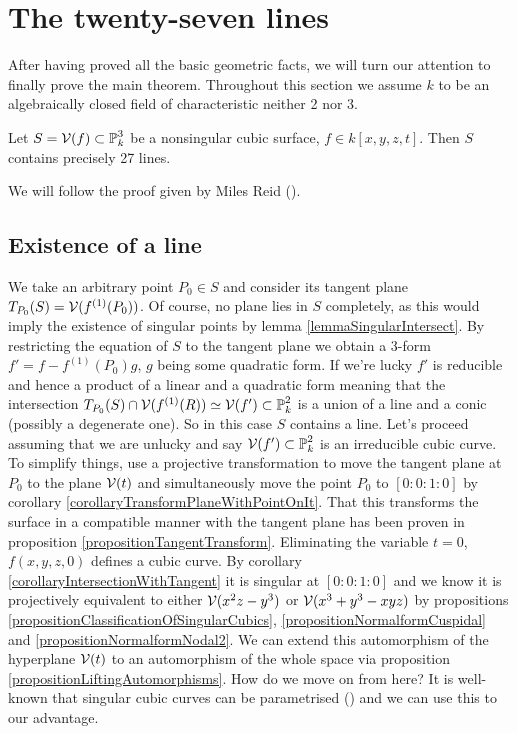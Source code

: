 \section{The twenty-seven lines}

After having proved all the basic geometric facts, we will turn our attention to finally prove the main theorem. Throughout this section we assume $k$ to be an algebraically closed field of characteristic neither 2 nor 3.
\begin{theorem}
Let $S = \operatorname{\mathcal V}(f) \subset \operatorname{\mathbb P}^3_k$ be a nonsingular cubic surface, $f\in k[x,y,z,t]$.
Then $S$ contains precisely 27 lines.
\end{theorem}
We will follow the proof given by Miles Reid (\cite[§7]{reid1988undergraduate}).

\subsection{Existence of a line}

We take an arbitrary point $P_0 \in S$ and consider its tangent plane $T_{P_0}(S) = \operatorname{\mathcal V}(f^{(1)}(P_0))$.
Of course, no plane lies in $S$ completely, as this would imply the existence of singular points by lemma \ref{lemmaSingularIntersect}.
By restricting the equation of $S$ to the tangent plane we obtain a 3-form $f' = f - f^{(1)}(P_0)g$, $g$ being some quadratic form.
If we're lucky $f'$ is reducible and hence a product of a linear and a quadratic form meaning that the intersection $T_{P_0}(S) \cap \operatorname{\mathcal V}(f^{(1)}(R)) \simeq \operatorname{\mathcal V}(f') \subset \operatorname{\mathbb P}^2_k$ is a union of a line and a conic (possibly a degenerate one).
So in this case $S$ contains a line.
Let's proceed assuming that we are unlucky and say $\operatorname{\mathcal V}(f') \subset \operatorname{\mathbb P}^2_k$ is an irreducible cubic curve.
To simplify things, use a projective transformation to move the tangent plane at $P_0$ to the plane $\operatorname{\mathcal V}(t)$ and simultaneously move the point $P_0$ to $[0:0:1:0]$ by corollary \ref{corollaryTransformPlaneWithPointOnIt}.
That this transforms the surface in a compatible manner with the tangent plane has been proven in proposition \ref{propositionTangentTransform}.
Eliminating the variable $t = 0$, $f(x,y,z,0)$ defines a cubic curve.
By corollary \ref{corollaryIntersectionWithTangent} it is singular at $[0:0:1:0]$ and we know it is projectively equivalent to either $\operatorname{\mathcal V}(x^2z - y^3)$ or $\operatorname{\mathcal V}(x^3 + y^3 - xyz)$ by propositions \ref{propositionClassificationOfSingularCubics}, \ref{propositionNormalformCuspidal} and \ref{propositionNormalformNodal2}.
We can extend this automorphism of the hyperplane $\operatorname{\mathcal V}(t)$ to an automorphism of the whole space via proposition \ref{propositionLiftingAutomorphisms}.
How do we move on from here?
It is well-known that singular cubic curves can be parametrised (\cite[chapter 1.1.2]{shafarevich1994basic}) and we can use this to our advantage.

